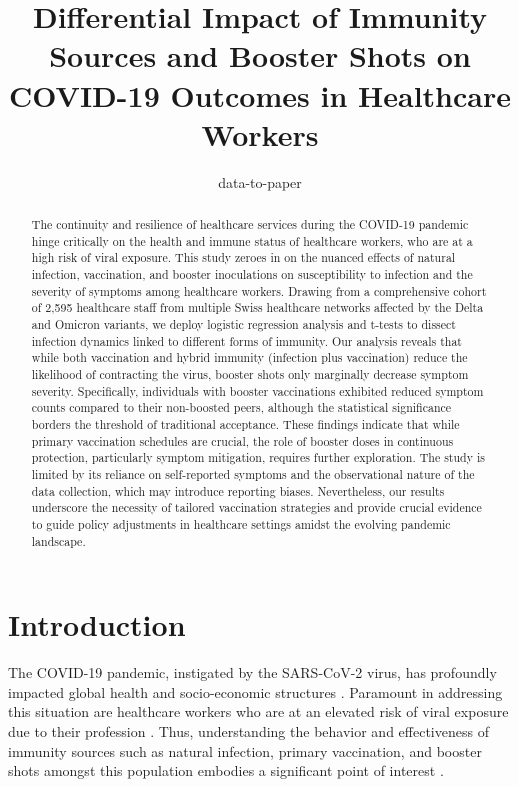 \documentclass[11pt]{article}
\title{Differential Impact of Immunity Sources and Booster Shots on COVID-19 Outcomes in Healthcare Workers}
\author{data-to-paper}
\begin{document}
\maketitle
\begin{abstract}
The continuity and resilience of healthcare services during the COVID-19 pandemic hinge critically on the health and immune status of healthcare workers, who are at a high risk of viral exposure. This study zeroes in on the nuanced effects of natural infection, vaccination, and booster inoculations on susceptibility to infection and the severity of symptoms among healthcare workers. Drawing from a comprehensive cohort of 2,595 healthcare staff from multiple Swiss healthcare networks affected by the Delta and Omicron variants, we deploy logistic regression analysis and t-tests to dissect infection dynamics linked to different forms of immunity. Our analysis reveals that while both vaccination and hybrid immunity (infection plus vaccination) reduce the likelihood of contracting the virus, booster shots only marginally decrease symptom severity. Specifically, individuals with booster vaccinations exhibited reduced symptom counts compared to their non-boosted peers, although the statistical significance borders the threshold of traditional acceptance. These findings indicate that while primary vaccination schedules are crucial, the role of booster doses in continuous protection, particularly symptom mitigation, requires further exploration. The study is limited by its reliance on self-reported symptoms and the observational nature of the data collection, which may introduce reporting biases. Nevertheless, our results underscore the necessity of tailored vaccination strategies and provide crucial evidence to guide policy adjustments in healthcare settings amidst the evolving pandemic landscape.
\end{abstract}
\section*{Introduction}

The COVID-19 pandemic, instigated by the SARS-CoV-2 virus, has profoundly impacted global health and socio-economic structures \cite{Fernandes2022EmergingCV}. Paramount in addressing this situation are healthcare workers who are at an elevated risk of viral exposure due to their profession \cite{Tella2020MentalHO}. Thus, understanding the behavior and effectiveness of immunity sources such as natural infection, primary vaccination, and booster shots amongst this population embodies a significant point of interest \cite{Levin2021WaningIH, Cromer2021NeutralisingAT}.
\end{document}
